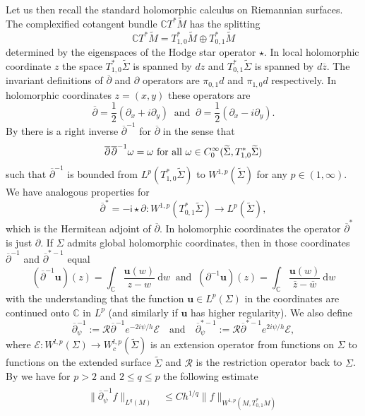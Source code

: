 \documentclass[a4paper, 10pt, twoside, notitlepage]{amsart}
\theoremstyle{plain}
\numberwithin{equation}{section}
\newcommand {\C} {\mathbb{C}} \newcommand {\Sn} {\mathbb{S}^n}
\newcommand {\p} {\partial}
\newcommand{\ol}[1]{\overline{#1}}
\newcommand{\norm}[1]{\lVert #1 \rVert}
\newcommand{\s}{\hspace{0.5pt}}
\newcommand{\op}{\overline \p}
\begin{document}
Let us then recall the standard holomorphic calculus on Riemannian surfaces. The complexified cotangent bundle $\C T^*\widetilde M$ has the splitting
\[
 \C T^*\widetilde M= T^*_{1,0}\widetilde M \oplus T^*_{0,1}\widetilde M
\]
determined by the eigenspaces of the Hodge star operator $\star$.  In local holomorphic coordinate $z$ the space $T^*_{1,0}\widetilde \Sigma$ is spanned by $dz$ and $T^*_{0,1}\widetilde \Sigma$ is spanned by $d\ol z$.  The invariant definitions of $\op$ and $\p$ operators are $\pi_{0,1}d$  and  $\pi_{1,0}d$ respectively.
	In holomorphic coordinates $z=(x,y)$ these operators are 
	\[
	 \op=\frac 12 (\p_x+i\p_y) \ \text{ and } \ \p=\frac 12  (\p_x-i\p_y). 
	\]
	By \cite[Proposition 2.1]{guillarmou2011identification} there is a right inverse $\op^{-1}$ for $\op$ in the sense that
	\[
	\op\s \s  \op^{-1}\omega=\omega \text{ for all } \omega\in C_0^\infty(\widetilde \Sigma,T_{1,0}^*\widetilde \Sigma)
	\]
	such that $\op^{-1}$ is bounded from $L^p(T_{1,0}^*\widetilde \Sigma)$ to $W^{1,p}(\widetilde \Sigma)$ for any $p\in (1,\infty)$. We have analogous properties for 
	\[
	\op^*=-\mathsf{i}\star \p: W^{1,p}(T_{0,1}^*\widetilde \Sigma)\to L^p(\widetilde \Sigma),
	\]
	which is the Hermitean adjoint of $\op$. In holomorphic coordinates  the operator  $\op^*$  is just  $\p$. If $\Sigma$ admits global holomorphic coordinates, then in those coordinates  $\op^{-1}$ and $\op^{*-1}$ equal
	\[
	 (\overline{\partial}^{-1} \mathbf{u})(z)=\int_{\C} \frac{\mathbf{u}(w)}{z-w} \mathrm{~d} w \ \text{ and } \  ({\partial}^{-1} \mathbf{u})(z)=\int_{\C}  \frac{\mathbf{u}(w)}{\overline z-\overline w} \mathrm{~d} w
	\]
	with the understanding that the function $\mathbf{u}\in L^p(\Sigma)$ in the coordinates are continued onto $\C$ in $L^p$ (and similarly if $\mathbf{u}$ has higher regularity). We also define 
	\[
	\op_\psi^{-1}:=\mathcal{R}\op^{-1}e^{-2i\psi/h}\mathcal{E} \quad \text{and}\quad  \op_\psi^{*-1}:=\mathcal{R}\op^{*-1}e^{2i\psi/h}\mathcal{E},
	\]
	where $\mathcal{E} : W^{l,p}(\Sigma) \to W_c^{l,p}(\widetilde \Sigma)$ is an extension operator from functions on $\Sigma$ to functions on the extended surface $\widetilde \Sigma$ and $\mathcal R$ is the restriction operator back to $\Sigma$. By \cite[Lemma 2.2 and Lemma 2.3]{guillarmou2011identification} we have for $p>2$ and $2\leq q\leq p$ the following estimate 
\begin{align}\label{eq:sobo_decay}
\begin{split}
  \norm{\overline \p_\psi^{-1}f}_{L^q(M)}&\leq C h^{1/q}\norm{f}_{W^{1,p}(M, T_{0,1}^*M)} 
 \end{split}
\end{align}
\end{document}

